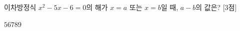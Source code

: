이차방정식 $x^2-5x-6=0$의 해가 $x=a$ 또는 $x=b$일 때, $a-b$의 값은?  \mbox{[3점]}
\begin{choices32}{$5$}{$6$}{$7$}{$8$}{$9$}\end{choices32}
